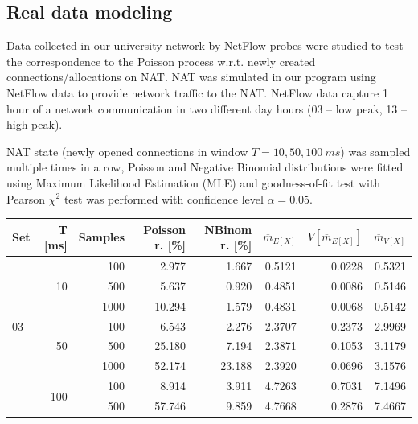 \documentclass[twoside]{article}
\begin{document}
\begin{multicols}{2}
\section{Real data modeling}
Data collected in our university network by NetFlow probes were studied to test the correspondence to the Poisson process
w.r.t. newly created connections/allocations on NAT. NAT was simulated in our program using
NetFlow data to provide network traffic to the NAT. NetFlow data capture 1 hour of a network communication in two different
day hours (03 -- low peak, 13 -- high peak).

NAT state (newly opened connections in window $T=10, 50, 100~ms$)
was sampled multiple times in a row, Poisson and Negative Binomial distributions were fitted using Maximum Likelihood Estimation (MLE)
and goodness-of-fit test with Pearson $\chi^2$ test was performed with confidence level $\alpha=0.05$.

\begin{table}[t]
  \centering
  \begin{tabular}{| l | r | r | r | r | r | r | r |} %
    \hline
    Set & T [ms] & Samples & Poisson r. [\%] & NBinom r. [\%] & $\overline{m}_{E[X]}$ &  $V[\overline{m}_{E[X]}]$  & $\overline{m}_{V[X]}$ \\ \hline \hline 
    \multirow{7}{*}{03} & \multirow{3}{*}{10}   & 100		& 2.977		& 1.667		& 0.5121        & 0.0228                    & 0.5321 \\ \cline{3-8}
      &      & 500      	& 5.637		& 0.920		& 0.4851        & 0.0086        & 0.5146 \\  \cline{3-8}
      &      & 1000     	& 10.294	& 1.579		& 0.4831        & 0.0068        & 0.5142 \\  \cline{2-8}
      & \multirow{3}{*}{50}     & 100     	& 6.543		& 2.276 	& 2.3707	& 0.2373 & 2.9969 \\ \cline{3-8}
      &      & 500     		& 25.180	& 7.194		& 2.3871        & 0.1053        & 3.1179 \\ \cline{3-8}
      &      & 1000    		& 52.174	& 23.188	& 2.3920        & 0.0696        & 3.1576 \\ \cline{2-8}
      & \multirow{2}{*}{100}  	& 100		& 8.914		& 3.911		& 4.7263        & 0.7031                    & 7.1496 \\ \cline{3-8}
      &      & 500     		& 57.746	& 9.859		& 4.7668	& 0.2876 	& 7.4667 					\\ \hline


\end{tabular}
\end{table}
\end{multicols}
\end{document}
